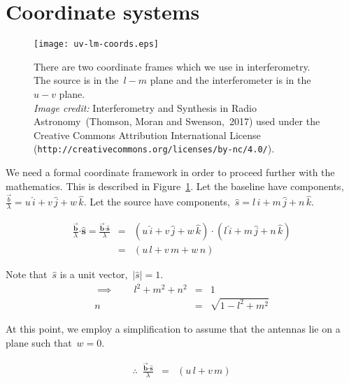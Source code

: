 \section{Coordinate systems}

\begin{figure}
  \centering
    \texttt{[image: uv-lm-coords.eps]}
    \caption[]{There are two coordinate frames which we use in interferometry. The source is in the~$l-m$ plane and the interferometer is in the~$u-v$ plane.\\ \emph{Image credit:} Interferometry and Synthesis in Radio Astronomy~(Thomson, Moran and Swenson,~2017) used under the Creative Commons Attribution International License (\texttt{http://creativecommons.org/licenses/by-nc/4.0/}). }
    \label{fig:uv-lm-coords}
\end{figure}

We need a formal coordinate framework in order to proceed further with the mathematics. This is described in Figure~\ref{fig:uv-lm-coords}. Let the baseline have components,~$\frac{\vec{b}}{\lambda } = u\,\hat{i} + v\,\hat{j} + w\,\hat{k}$. Let the source have components,~$\hat{s} = l\,\hat{i} + m\,\hat{j} + n\,\hat{k}$.

\begin{eqnarray}
  \label{eq:18}
\frac{\vec{\mathbf{b}}}{\lambda }\boldsymbol{\cdot} \mathbf{\hat{s}} = \frac{\vec{\mathbf{b}} \boldsymbol{\cdot} \mathbf{\hat{s}}}{\lambda } &=& (u\,\hat{i} + v\,\hat{j} + w\,\hat{k}) \cdot (l\,\hat{i} + m\,\hat{j} + n\,\hat{k}) \nonumber \\
                                         &=& (u\,l + v\,m + w\,n) \nonumber
\end{eqnarray}

\begin{braced}
Note that~$\hat{s}$ is a unit vector,~$|\hat{s}| = 1$.
\begin{eqnarray}
  \label{eq:20}
  \implies \qquad l^2 + m^2 + n^2 &=& 1 \nonumber \\
                                n &=& \sqrt{1 - l^2 + m^2} \nonumber
\end{eqnarray}
\end{braced}
\vspace{0.5cm}

At this point, we employ a simplification to assume that the antennas lie on a plane such that~$w = 0$.

\begin{eqnarray}
  \label{eq:22}
  \therefore \enspace \frac{\vec{\mathbf{b}} \boldsymbol{\cdot} \mathbf{\hat{s}}}{\lambda } &=& (u\,l + v\,m) \nonumber
\end{eqnarray}

